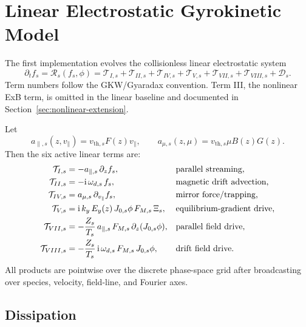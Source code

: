 \documentclass[11pt,a4paper]{article}
\newcommand{\ii}{\mathrm{i}}
\newcommand{\vpar}{v_{\parallel}}
\newcommand{\RHS}{\mathcal{R}}
\newcommand{\Dop}{\mathcal{D}}
\begin{document}
\section{Linear Electrostatic Gyrokinetic Model}

The first implementation evolves the collisionless linear electrostatic system
\begin{equation}
  \partial_t f_s
  =
  \RHS_s(f_s,\phi)
  =
  \mathcal{T}_{I,s}
  +\mathcal{T}_{II,s}
  +\mathcal{T}_{IV,s}
  +\mathcal{T}_{V,s}
  +\mathcal{T}_{VII,s}
  +\mathcal{T}_{VIII,s}
  +\Dop_s.
  \label{eq:linear-rhs}
\end{equation}
Term numbers follow the GKW/Gyaradax convention.  Term III, the nonlinear ExB term, is omitted in the linear baseline and documented in Section~\ref{sec:nonlinear-extension}.

Let
\begin{equation}
  a_{\parallel,s}(z,\vpar)=v_{\mathrm{th},s}F(z)\vpar,
  \qquad
  a_{\mu,s}(z,\mu)=v_{\mathrm{th},s}\mu B(z)G(z).
  \label{eq:adv-speeds}
\end{equation}
Then the six active linear terms are:
\begin{align}
  \mathcal{T}_{I,s}
  &=
  -a_{\parallel,s}\,\partial_z f_s,
  &&\hbox{parallel streaming,}
  \label{eq:term-I}
  \\
  \mathcal{T}_{II,s}
  &=
  -\ii\,\omega_{d,s}\,f_s,
  &&\hbox{magnetic drift advection,}
  \label{eq:term-II}
  \\
  \mathcal{T}_{IV,s}
  &=
  a_{\mu,s}\,\partial_{\vpar} f_s,
  &&\hbox{mirror force/trapping,}
  \label{eq:term-IV}
  \\
  \mathcal{T}_{V,s}
  &=
  \ii\,k_y\,E_y(z)\,
  J_{0,s}\phi\,
  F_{M,s}\,\Xi_s,
  &&\hbox{equilibrium-gradient drive,}
  \label{eq:term-V}
  \\
  \mathcal{T}_{VII,s}
  &=
  -\frac{Z_s}{T_s}\,
  a_{\parallel,s}\,
  F_{M,s}\,
  \partial_z(J_{0,s}\phi),
  &&\hbox{parallel field drive,}
  \label{eq:term-VII}
  \\
  \mathcal{T}_{VIII,s}
  &=
  -\frac{Z_s}{T_s}\,
  \ii\,\omega_{d,s}\,
  F_{M,s}\,
  J_{0,s}\phi,
  &&\hbox{drift field drive.}
  \label{eq:term-VIII}
\end{align}
All products are pointwise over the discrete phase-space grid after broadcasting over species, velocity, field-line, and Fourier axes.

\subsection{Dissipation}
\end{document}
